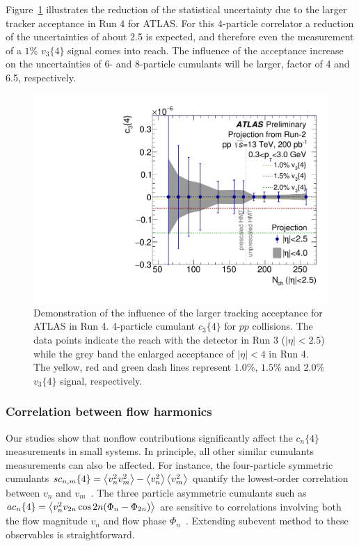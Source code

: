 Figure~\ref{fig:subcumu_ATLAS_c34_proj2} illustrates the reduction of the statistical uncertainty due to the larger tracker acceptance in Run 4 for ATLAS. For this 4-particle correlator a reduction of the uncertainties of about 2.5 is expected, and therefore even the measurement of a $1\%$ $v_3\{4\}$ signal comes into reach. The influence of the acceptance increase on the uncertainties of 6- and 8-particle cumulants will be larger, factor of 4 and 6.5, respectively.

\begin{figure}[H]
\centering
\includegraphics[width=.475\linewidth]{figs/chapter_subcumu/ATLAS_c34_pp_proj2.pdf}
\caption{Demonstration of the influence of the larger tracking acceptance for ATLAS in Run 4. 4-particle cumulant $c_3\{4\}$ for $pp$ collisions. The data points indicate the reach with the detector in Run 3 ($|\eta|<2.5$) while the grey band the enlarged acceptance of $|\eta|<4$ in Run 4. The yellow, red and green dash lines represent $1.0\%$, $1.5\%$ and $2.0\%$ $v_3\{4\}$ signal, respectively.}
\label{fig:subcumu_ATLAS_c34_proj2}
\end{figure}



\subsubsection{Correlation between flow harmonics}

Our studies show that nonflow contributions significantly affect the $c_n\{4\}$ measurements in small systems. In principle, all other similar cumulants measurements can also be affected. For instance, the four-particle symmetric cumulants $sc_{n,m}\{4\}=\left\langle v_n^2 v_m^2\right\rangle-\left\langle v_n^2\right\rangle\left\langle v_m^2\right\rangle$ quantify the lowest-order correlation between $v_n$ and $v_m$~\cite{Bilandzic:2013kga}. The three particle asymmetric cumulants such as $ac_n\{4\}=\left\langle v_n^2 v_{2n} \cos 2n(\Phi_n-\Phi_{2n})\right\rangle$ are sensitive to correlations involving both the flow magnitude $v_n$ and flow phase $\Phi_n$~\cite{Jia:2017hbm}. Extending subevent method to these observables is straightforward.


